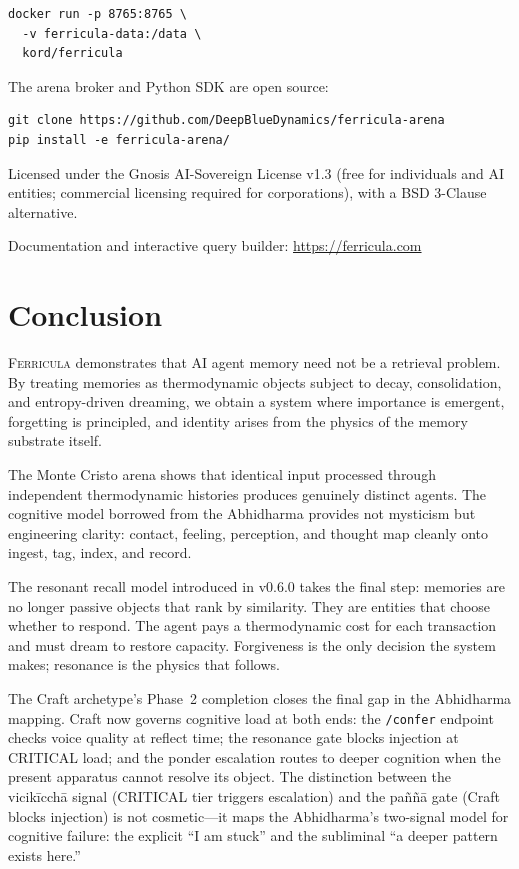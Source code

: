 \documentclass[twocolumn,10pt]{article}
\begin{document}
\begin{lstlisting}
docker run -p 8765:8765 \
  -v ferricula-data:/data \
  kord/ferricula
\end{lstlisting}

\noindent
The arena broker and Python SDK are open source:

\begin{lstlisting}
git clone https://github.com/DeepBlueDynamics/ferricula-arena
pip install -e ferricula-arena/
\end{lstlisting}

\noindent
Licensed under the Gnosis AI-Sovereign License v1.3
(free for individuals and AI entities; commercial licensing required
for corporations), with a BSD 3-Clause alternative.

Documentation and interactive query builder:
\url{https://ferricula.com}

\section{Conclusion}

\textsc{Ferricula} demonstrates that AI agent memory need not be
a retrieval problem.  By treating memories as thermodynamic objects
subject to decay, consolidation, and entropy-driven dreaming, we
obtain a system where importance is emergent, forgetting is principled,
and identity arises from the physics of the memory substrate itself.

The Monte Cristo arena shows that identical input processed through
independent thermodynamic histories produces genuinely distinct agents.
The cognitive model borrowed from the Abhidharma provides not mysticism
but engineering clarity: contact, feeling, perception, and thought
map cleanly onto ingest, tag, index, and record.

The resonant recall model introduced in v0.6.0 takes the final step:
memories are no longer passive objects that rank by similarity.  They
are entities that choose whether to respond.  The agent pays a
thermodynamic cost for each transaction and must dream to restore
capacity.  Forgiveness is the only decision the system makes;
resonance is the physics that follows.

The Craft archetype's Phase~2 completion closes the final gap in the
Abhidharma mapping.  Craft now governs cognitive load at both ends: the
\texttt{/confer} endpoint checks voice quality at reflect time; the
resonance gate blocks injection at CRITICAL load; and the ponder escalation
routes to deeper cognition when the present apparatus cannot resolve its
object.  The distinction between the vicik\=icch\=a signal (CRITICAL tier
triggers escalation) and the pa\~n\~n\=a gate (Craft blocks injection) is
not cosmetic---it maps the Abhidharma's two-signal model for cognitive
failure: the explicit ``I am stuck'' and the subliminal ``a deeper pattern
exists here.''
\end{document}
